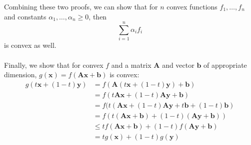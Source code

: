 \documentclass{article}
\begin{document}
Combining these two proofs, we can show that for $n$ convex functions $f_1, \dots, f_n$ and constants $\alpha_1, \dots, \alpha_n \geq 0$, then $$\sum_{i=1}^n \alpha_if_i$$ is convex as well. \\\\
Finally, we show that for convex $f$ and a matrix $\mathbf{A}$ and vector $\mathbf{b}$ of appropriate dimension, $g(\mathbf{x}) = f(\mathbf{Ax + b})$ is convex:
\begin{align*}
g(t\mathbf{x} + (1-t)\mathbf{y}) &= f(\mathbf{A}(t\mathbf{x} + (1-t)\mathbf{y}) + \mathbf{b}) \\
&= f(t\mathbf{Ax} + (1-t)\mathbf{Ay + b}) \\
&= f(t(\mathbf{Ax} + (1-t)\mathbf{Ay} + t\mathbf{b} + (1-t)\mathbf{b}) \\
&= f(t(\mathbf{Ax + b}) + (1-t)(\mathbf{Ay + b})) \\
&\leq tf(\mathbf{Ax + b}) + (1-t)f(\mathbf{Ay + b})\\
&= tg(\mathbf{x}) + (1-t)g(\mathbf{y})
\end{align*}
\end{document}
